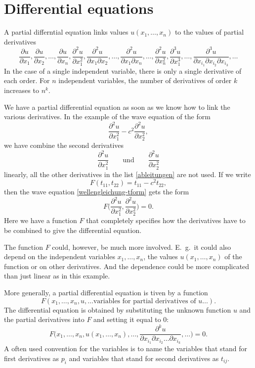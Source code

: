 %
%
%
\section{Differential equations\label{klassifikation:differentialgleichungen}}
A partial differntial equation links values 
$u(x_1,\dots,x_n)$
to the values of partial derivatives
\begin{equation}
\frac{\partial u}{\partial x_1},
\frac{\partial u}{\partial x_2},
\dots,
\frac{\partial u}{\partial x_n},
\frac{\partial^2 u}{\partial x_1^2},
\frac{\partial^2 u}{\partial x_1\partial x_2},\dots,
\frac{\partial^2 u}{\partial x_1\partial x_n},\dots,
\frac{\partial^2 u}{\partial x_n^2},
\frac{\partial^3 u}{\partial x_1^3},\dots,
\frac{\partial^3 u}{\partial x_{i_1}\partial x_{i_2}\partial x_{i_3}},\dots
\label{ableitungen}
\end{equation}
In the case of a single independent variable, there is only a single
derivative of each order.
For $n$ independent variables, the number of derivatives of order $k$
increases to $n^k$.

We have a partial differential equation as soon as we know how to
link the various derivatives.
In the example of the wave equation of the form
\begin{equation}
\frac{\partial^2 u}{\partial x_1^2}
-
c^2\frac{\partial^2 u}{\partial x_2^2},
\label{wellengleichung-tform}
\end{equation}
we have combine the second derivatives 
\[
\frac{\partial^2 u}{\partial x_1^2}
\qquad
\text{und}
\qquad
\frac{\partial^2 u}{\partial x_2^2}
\]
linearly, all the other derivatives in the list
\eqref{ableitungen}
are not used.
If we write
\[
F(t_{11}, t_{22}) = t_{11} -c^2t_{22},
\]
then the wave equation
\eqref{wellengleichung-tform}
gets the form
\[
F\biggl(
\frac{\partial^2 u}{\partial x_1^2},
\frac{\partial^2 u}{\partial x_2^2}
\biggr)=0.
\]
Here we have a function $F$ that completely specifies how the
derivatives have to be combined to give the differential equation.

The function $F$ could, however, be much more involved.
E.~g.~it could also depend on the independent variables
$x_1,\dots,x_n$, the values $u(x_1,\dots,x_n)$ of the function
or on other derivatives.
And the dependence could be more complicated than just linear as
in this example.

More generally, a partial differential equation is tiven by a function
\[
F(x_1,\dots,x_n,u,\dots\text{variables for partial derivatives of $u$}\dots).
\]
The differential equation is obtained by substituting the unknown function $u$
and the partial derivatives into $F$ and setting it equal to $0$:
\[
F\biggl(x_1,\dots,x_n,u(x_1,\dots,x_n),\dots,
\frac{\partial^k u}{\partial x_{i_1}\partial x_{i_2}\dots \partial x_{i_k}},\dots\biggr)=0.
\]
A often used convention for the variables is to name the variables that
stand for first derivatives as $p_i$ and variables that stand for second
derivatives as $t_{ij}$.

